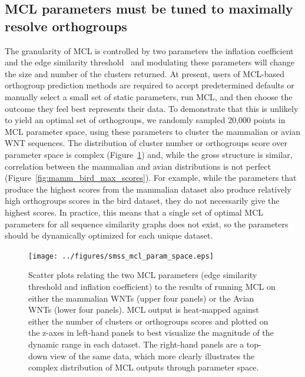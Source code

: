 \documentclass[twocolumn]{bmcart}  %
\begin{document}
\subsection{MCL parameters must be tuned to maximally resolve orthogroups}\label{subsec:TuningParams}
The granularity of MCL is controlled by two parameters \textemdash{} the inflation coefficient and the edge similarity threshold~\cite{VanDongen:kJZ890qx} \textemdash{} and modulating these parameters will change the size and number of the clusters returned.
At present, users of MCL-based orthogroup prediction methods are required to accept predetermined defaults or manually select a small set of static parameters, run MCL, and then choose the outcome they feel best represents their data.
To demonstrate that this is unlikely to yield an optimal set of orthogroups, we randomly sampled 20,000 points in MCL parameter space, using these parameters to cluster the mammalian or avian WNT sequences.
The distribution of cluster number or orthogroups score over parameter space is complex (Figure~\ref{fig:smss_mcl_param_space}) and, while the gross structure is similar, correlation between the mammalian and avian distributions is not perfect (Figure~\ref{fig:mamm_bird_max_scores}).
For example, while the parameters that produce the highest scores from the mammalian dataset also produce relatively high orthogroups scores in the bird dataset, they do not necessarily give the highest scores.
In practice, this means that a single set of optimal MCL parameters for all sequence similarity graphs does not exist,
so the parameters should be dynamically optimized for each unique dataset.


\begin{figure}[t]
  \begin{center}
  \texttt{[image: ../figures/smss\_mcl\_param\_space.eps]}
\end{center}
\caption{Scatter plots relating the two MCL parameters (edge similarity threshold and inflation coefficient) to the results of running MCL on either the mammalian WNTs (upper four panels) or the Avian WNTs (lower four panels).
MCL output is heat-mapped against either the number of clusters or orthogroups scores and plotted on the z-axes in left-hand panels to best visualize the magnitude of the dynamic range in each dataset.
The right-hand panels are a top-down view of the same data, which more clearly illustrates the complex distribution of MCL outputs through parameter space.}
\label{fig:smss_mcl_param_space}
\end{figure}
\end{document}
